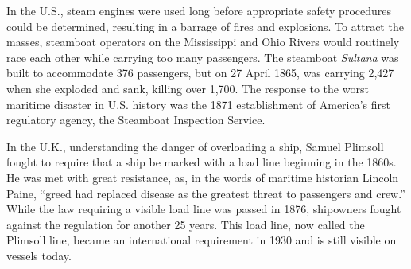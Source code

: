 \documentclass[twoside,symmetric,notoc]{tufte-book}
\begin{document}
\par{%
In the U.S., steam engines were used long before appropriate safety procedures could be determined, resulting in a barrage of fires and explosions.\cite{Selcer} To attract the masses, steamboat operators on the Mississippi and Ohio Rivers would routinely race each other while carrying too many passengers.\cite{Collier} The steamboat \textit{Sultana} was built to accommodate 376 passengers, but on 27 April 1865, was carrying 2,427 when she exploded and sank, killing over 1,700.\cite[-0.3in]{Huffman} The response to the worst maritime disaster in U.S. history was the 1871 establishment of America's first regulatory agency, the Steamboat Inspection Service.\cite{Voulgaris}
}
\par{%
In the U.K., understanding the danger of overloading a ship, Samuel Plimsoll fought to require that a ship be marked with a load line beginning in the 1860s.\cite{Hemenway} He was met with great resistance,  as, in the words of maritime historian Lincoln Paine, ``greed had replaced disease as the greatest threat to passengers and crew.''\cite{Paine} While the law requiring a visible load line was passed in 1876, shipowners fought against the regulation\cite{Mansell} for another 25 years.\cite{Arnott} This load line, now called the Plimsoll line, became an international requirement in 1930 and is still visible on vessels today.
}
\end{document}
